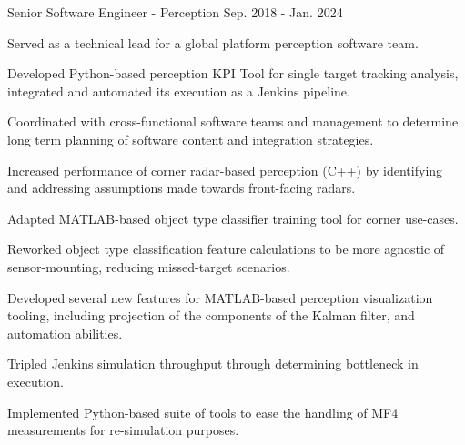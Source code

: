 \begin{cventries}
  \cventry
    {Senior Software Engineer - Perception} %
    {} %
    {} %
    {Sep. 2018 - Jan. 2024} %
    {
      \begin{cvitems} %
        \item {Served as a technical lead for a global platform perception software team.}
        \item {Developed Python-based perception KPI Tool for single target tracking analysis, integrated and automated its execution as a Jenkins pipeline.}
        \item {Coordinated with cross-functional software teams and management to determine long term planning of software content and integration strategies.}
        \item {Increased performance of corner radar-based perception (C++) by identifying and addressing assumptions made towards front-facing radars.}
        \item {Adapted MATLAB-based object type classifier training tool for corner use-cases.}
        \item {Reworked object type classification feature calculations to be more agnostic of sensor-mounting, reducing missed-target scenarios.}
        \item {Developed several new features for MATLAB-based perception visualization tooling, including projection of the components of the Kalman filter, and automation abilities.}
        \item {Tripled Jenkins simulation throughput through determining bottleneck in execution.}
        \item {Implemented Python-based suite of tools to ease the handling of MF4 measurements for re-simulation purposes.} 
      \end{cvitems}
    }


\end{cventries}
